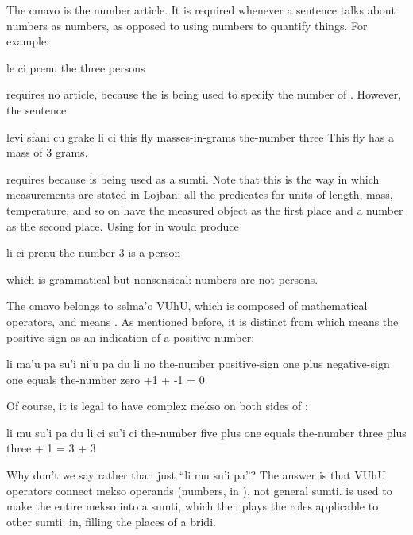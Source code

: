 The cmavo  is the number article. It is required
    whenever a sentence talks about numbers as numbers, as opposed
    to using numbers to quantify things. For example:
\begin{example}
le ci prenu\n
the three persons
\end{example}

{\noindent}requires no  article, because the  is being used to
    specify the number of . However, the sentence
\begin{example}
levi sfani cu grake li ci\n
this fly masses-in-grams the-number three\n
This fly has a mass of 3 grams.
\end{example}

{\noindent}requires  because  is being used as a sumti. Note
    that this is the way in which measurements are stated in
    Lojban: all the predicates for units of length, mass,
    temperature, and so on have the measured object as the first
    place and a number as the second place. Using  for 
    in  would produce
\begin{example}
li ci prenu\n
the-number 3 is-a-person
\end{example}

{\noindent}which is grammatical but nonsensical: numbers are not persons. 

The cmavo  belongs to selma'o VUhU, which is
    composed of mathematical operators, and means . As
    mentioned before, it is distinct from  which means the
    positive sign as an indication of a positive number:
\begin{example}
li ma'u pa su'i ni'u pa\n
\T	du li no\n
the-number positive-sign one plus negative-sign one\n
\T	equals the-number zero\n
+1 + -1 = 0
\end{example}

Of course, it is legal to have complex mekso on both sides
    of :
\begin{example}
li mu su'i pa\n
\T	du li ci su'i ci\n
the-number five plus one\n
\T	equals the-number three plus three + 1 = 3 + 3
\end{example}

Why don't we say  rather than just ``li mu
    su'i pa''? The answer is that VUhU operators connect mekso
    operands (numbers, in ), not
    general sumti.  is used to make the entire mekso into a
    sumti, which then plays the roles applicable to other sumti: in, filling the places of a bridi.


